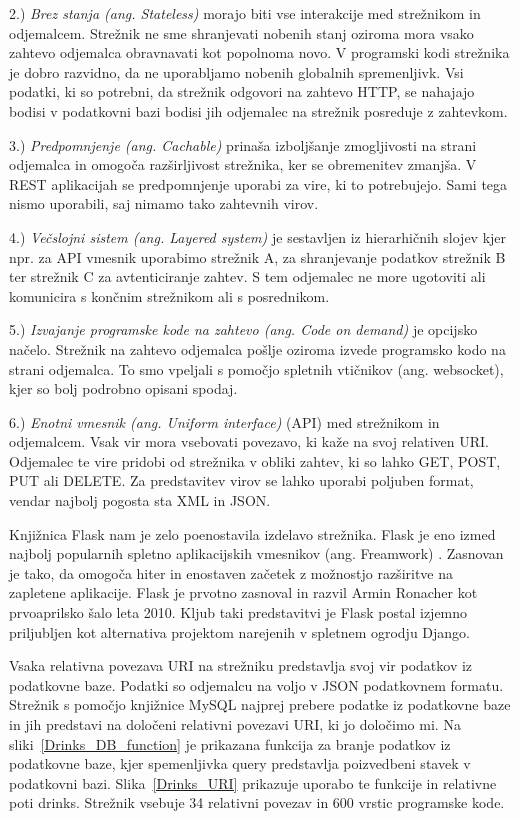 \documentclass[a4paper, 12pt]{book}
\begin{document}
2.)\textit{ Brez stanja (ang. Stateless)} morajo biti vse interakcije med strežnikom in odjemalcem. Strežnik ne sme shranjevati nobenih stanj oziroma mora vsako zahtevo odjemalca obravnavati kot popolnoma novo. V programski kodi strežnika je dobro razvidno, da ne uporabljamo nobenih globalnih spremenljivk. Vsi podatki, ki so potrebni, da strežnik odgovori na zahtevo HTTP, se nahajajo bodisi v podatkovni bazi bodisi jih odjemalec na strežnik posreduje z zahtevkom.

3.)\textit{ Predpomnjenje (ang. Cachable)} prinaša izboljšanje zmogljivosti na strani odjemalca in omogoča razširljivost strežnika, ker se obremenitev zmanjša. V REST aplikacijah se predpomnjenje uporabi za vire, ki to potrebujejo. Sami tega nismo uporabili, saj nimamo tako zahtevnih virov.

4.)\textit{ Večslojni sistem (ang. Layered system)} je sestavljen iz hierarhičnih slojev kjer npr. za API vmesnik uporabimo strežnik A, za shranjevanje podatkov strežnik B ter strežnik C za avtenticiranje zahtev. S tem odjemalec ne more ugotoviti ali komunicira s končnim strežnikom ali s posrednikom.

5.)\textit{ Izvajanje programske kode na zahtevo (ang. Code on demand)} je opcijsko načelo. Strežnik na zahtevo odjemalca pošlje oziroma izvede programsko kodo na strani odjemalca. To smo vpeljali s pomočjo spletnih vtičnikov (ang. websocket), kjer so bolj podrobno opisani spodaj.

6.)\textit{ Enotni vmesnik (ang. Uniform interface)} (API) med strežnikom in odjemalcem. Vsak vir mora vsebovati povezavo, ki kaže na svoj relativen URI. Odjemalec te vire pridobi od strežnika v obliki zahtev, ki so lahko GET, POST, PUT ali DELETE. Za predstavitev virov se lahko uporabi poljuben format, vendar najbolj pogosta sta XML in JSON. 

Knjižnica Flask nam je zelo poenostavila izdelavo strežnika. Flask je eno izmed najbolj popularnih spletno aplikacijskih vmesnikov (ang. Freamwork) \cite{Flask}. Zasnovan je tako, da omogoča hiter in enostaven začetek z možnostjo razširitve na zapletene aplikacije. Flask je prvotno zasnoval in razvil Armin Ronacher kot prvoaprilsko šalo leta 2010. Kljub taki predstavitvi je Flask postal izjemno priljubljen kot alternativa projektom narejenih v spletnem ogrodju Django.

Vsaka relativna povezava URI na strežniku predstavlja svoj vir podatkov iz podatkovne baze. Podatki so odjemalcu na voljo v JSON podatkovnem formatu. Strežnik s pomočjo knjižnice MySQL najprej prebere podatke iz podatkovne baze in jih predstavi na določeni relativni povezavi URI, ki jo določimo mi. Na sliki~\ref{Drinks_DB_function} je prikazana funkcija za branje podatkov iz podatkovne baze, kjer spemenljivka query predstavlja poizvedbeni stavek v podatkovni bazi. Slika~\ref{Drinks_URI} prikazuje uporabo te funkcije in relativne poti drinks. Strežnik vsebuje 34 relativni povezav in 600 vrstic programske kode.
\end{document}
